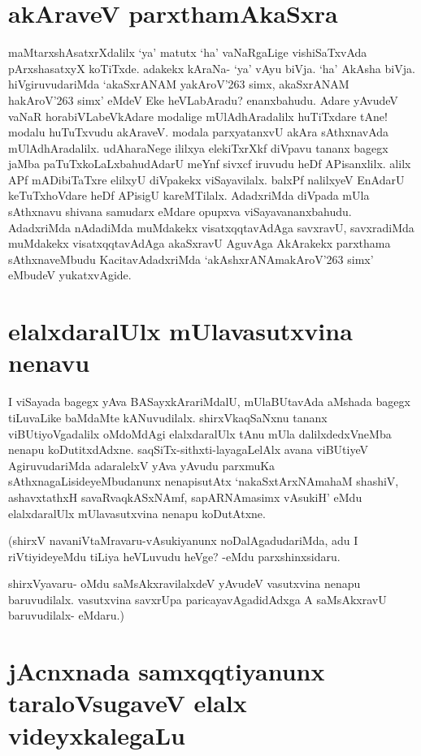 \section*{akAraveV parxthamAkaSxra}

maMtarxshAsatxrXdalilx `ya' matutx `ha' vaNaRgaLige vishiSaTxvAda pArxshasatxyX koTiTxde. adakekx kAraNa- `ya' vAyu biVja. `ha' AkAsha biVja. hiVgiruvudariMda `akaSxrANAM yakAroV\char'263 simx, akaSxrANAM hakAroV\char'263 simx' eMdeV Eke heVLabAradu? enanxbahudu. Adare yAvudeV vaNaR horabiVLabeVkAdare modalige mUlAdhAradalilx huTiTxdare tAne! modalu huTuTxvudu akAraveV. modala parxyatanxvU akAra sAthxnavAda mUlAdhAradalilx. udAharaNege ililxya elekiTxrXkf diVpavu tananx bagegx jaMba paTuTxkoLaLxbahudAdarU meYnf sivxcf iruvudu heDf APisanxlilx. alilx APf mADibiTaTxre elilxyU diVpakekx viSayavilalx. balxPf nalilxyeV EnAdarU keTuTxhoVdare heDf APisigU kareMTilalx. AdadxriMda diVpada mUla sAthxnavu shivana samudarx eMdare opupxva viSayavananxbahudu. AdadxriMda nAdadiMda muMdakekx visatxqqtavAdAga savxravU, savxradiMda muMdakekx visatxqqtavAdAga akaSxravU AguvAga AkArakekx parxthama sAthxnaveMbudu KacitavAdadxriMda `akAshxrANAmakAroV\char'263 simx'\label{97} eMbudeV yukatxvAgide.

\section*{elalxdaralUlx mUlavasutxvina nenavu}

I viSayada bagegx yAva BASayxkArariMdalU, mUlaBUtavAda aMshada bagegx tiLuvaLike baMdaMte kANuvudilalx. shirxVkaqSaNxnu tananx viBUtiyoVgadalilx oMdoMdAgi elalxdaralUlx tAnu mUla dalilxdedxVneMba nenapu koDutitxdAdxne. saqSiTx-sithxti-layagaLelAlx avana viBUtiyeV AgiruvudariMda adaralelxV yAva yAvudu parxmuKa sAthxnagaLisideyeMbudanunx nenapisutAtx `nakaSxtArxNAmahaM shashiV, ashavxtathxH savaRvaqkASxNAmf,\label{98} sapARNAmasimx vAsukiH'\label{98b} eMdu elalxdaralUlx mUlavasutxvina nenapu koDutAtxne.

(shirxV navaniVtaMravaru-vAsukiyanunx noDalAgadudariMda, adu I riVtiyideyeMdu tiLiya heVLuvudu heVge? -eMdu parxshinxsidaru.

shirxVyavaru- oMdu saMsAkxravilalxdeV yAvudeV vasutxvina nenapu baruvudilalx. vasutxvina savxrUpa paricayavAgadidAdxga A saMsAkxravU baruvudilalx- eMdaru.)

\section*{jAcnxnada samxqqtiyanunx taraloVsugaveV elalx videyxkalegaLu}

